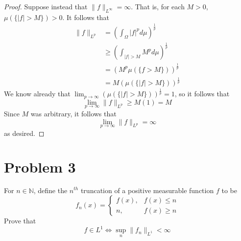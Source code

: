 \documentclass[fontsize=11pt]{scrartcl} %
\numberwithin{equation}{section} %
\numberwithin{figure}{section} %
\numberwithin{table}{section} %
\newcommand{\N}{\mathbb{N}}
\begin{document}
\begin{proof}
    Suppose instead that $\|f\|_{L^{\infty}} = \infty$. That is, for each $M>0$,
    $\mu(\{|f|>M\})>0$. It follows that
    \[
        \begin{aligned}
            \|f\|_{L^p} &= \left(\int_{\Omega}|f|^pd\mu\right)^{\frac{1}{p}}\\
                        &\geq \left(\int_{|f|>M}M^pd\mu\right)^{\frac{1}{p}}\\
                        &= \left(M^p\mu(\{f>M\})\right)^{\frac{1}{p}}\\
                        &= M(\mu(\{|f|>M\}))^{\frac{1}{p}}
        \end{aligned}
    \]
    We know already that $\lim_{p\to\infty}(\mu(\{|f|>M\}))^{\frac{1}{p}} = 1$,
    so it follows that
    \[
        \lim_{p\to\infty}\|f\|_{L^p} \geq M(1) = M
    \]
    Since $M$ was arbitrary, it follows that
    \[
        \lim_{p\to\infty}\|f\|_{L^p} = \infty
    \]
    as desired.
\end{proof}

\newpage

\section*{Problem 3}
For $n\in\N$, define the $n^{th}$ truncation of a positive measurable function
$f$ to be
\[
    f_n(x) = \begin{cases}
        f(x), &f(x)\leq n\\
        n, &f(x)\geq n
    \end{cases}
\]
Prove that 
\[
    f\in L^1 \iff \sup_n \|f_n\|_{L^1} < \infty
\]
\end{document}

